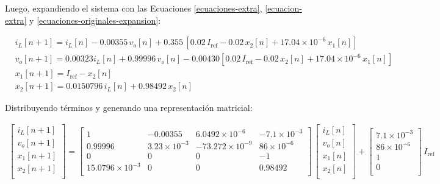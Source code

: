 Luego, expandiendo el sistema con las Ecuaciones \ref{ecuaciones-extra}, \ref{ecuacion-extra} y \ref{ecuaciones-originales-expansion}:

\begin{equation*}
  \begin{split}
    &i_L \left[n+1\right] = i_L\left[n\right] - 0.00355 \, v_o\left[n\right] + 0.355 \, \left[ 0.02 \, I_{\mathrm{ref}} -  0.02\, x_2\left[n\right] + 17.04 \times 10^{-6} \, x_1\left[n\right] \right]
    \\
    & v_o\left[n+1\right] = 0.00323 i_L\left[n\right] + 0.99996 \, v_o\left[n\right] - 0.00430 \left[ 0.02 \, I_{\mathrm{ref}} -  0.02\, x_2\left[n\right] + 17.04 \times 10^{-6} \, x_1\left[n\right] \right]
    \\
    & x_1\left[n+1\right] = I_{\mathrm{ref}} - x_2\left[n\right]
    \\
    & x_2\left[n+1\right] = 0.0150796 \, i_L\left[n\right] + 0.98492 \, x_2\left[n\right]
  \end{split}
\end{equation*}

Distribuyendo términos y generando una representación matricial:

\begin{align*}
  \boxed{
  \begin{bmatrix}
    i_L\left[n+1\right]\\
    v_o\left[n+1\right]\\  
    x_1\left[n+1\right]\\  
    x_2\left[n+1\right]\\  
  \end{bmatrix}
  =
  \begin{bmatrix}
    1 & -0.00355 & 6.0492 \times 10^{-6} & -7.1 \times 10^{-3}\\
    0.99996 & 3.23 \times 10^{-3} & -73.272 \times 10^{-9} & 86 \times 10^{-6}\\
    0 & 0 & 0 & -1 \\
    15.0796 \times 10^{-3} & 0 & 0 & 0.98492 \\
  \end{bmatrix}
  \,
  \begin{bmatrix}
    i_L\left[n\right]\\
    v_o\left[n\right]\\  
    x_1\left[n\right]\\  
    x_2\left[n\right]\\  
  \end{bmatrix}
  +
  \begin{bmatrix}
    7.1 \times 10^{-3}\\
    86 \times 10^{-6}\\  
    1\\  
    0\\  
  \end{bmatrix}
  \,
  I_{\mathrm{ref}}
  }
\end{align*}

